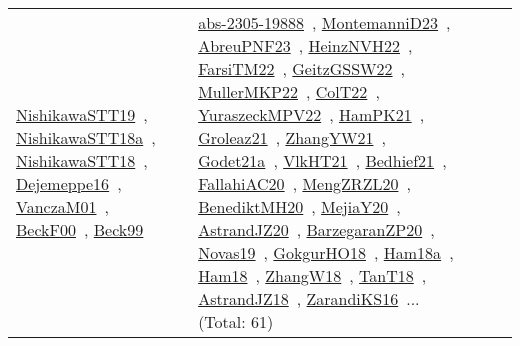 {\begin{longtable}{lp{3cm}>{\raggedright\arraybackslash}p{6cm}>{\raggedright\arraybackslash}p{6cm}>{\raggedright\arraybackslash}p{8cm}}
\href{works/NishikawaSTT19.pdf}{NishikawaSTT19}~\cite{NishikawaSTT19}, \href{works/NishikawaSTT18a.pdf}{NishikawaSTT18a}~\cite{NishikawaSTT18a}, \href{works/NishikawaSTT18.pdf}{NishikawaSTT18}~\cite{NishikawaSTT18}, \href{works/Dejemeppe16.pdf}{Dejemeppe16}~\cite{Dejemeppe16}, \href{works/VanczaM01.pdf}{VanczaM01}~\cite{VanczaM01}, \href{works/BeckF00.pdf}{BeckF00}~\cite{BeckF00}, \href{works/Beck99.pdf}{Beck99}~\cite{Beck99} & \href{works/abs-2305-19888.pdf}{abs-2305-19888}~\cite{abs-2305-19888}, \href{works/MontemanniD23.pdf}{MontemanniD23}~\cite{MontemanniD23}, \href{works/AbreuPNF23.pdf}{AbreuPNF23}~\cite{AbreuPNF23}, \href{works/HeinzNVH22.pdf}{HeinzNVH22}~\cite{HeinzNVH22}, \href{works/FarsiTM22.pdf}{FarsiTM22}~\cite{FarsiTM22}, \href{works/GeitzGSSW22.pdf}{GeitzGSSW22}~\cite{GeitzGSSW22}, \href{works/MullerMKP22.pdf}{MullerMKP22}~\cite{MullerMKP22}, \href{works/ColT22.pdf}{ColT22}~\cite{ColT22}, \href{works/YuraszeckMPV22.pdf}{YuraszeckMPV22}~\cite{YuraszeckMPV22}, \href{works/HamPK21.pdf}{HamPK21}~\cite{HamPK21}, \href{works/Groleaz21.pdf}{Groleaz21}~\cite{Groleaz21}, \href{works/ZhangYW21.pdf}{ZhangYW21}~\cite{ZhangYW21}, \href{works/Godet21a.pdf}{Godet21a}~\cite{Godet21a}, \href{works/VlkHT21.pdf}{VlkHT21}~\cite{VlkHT21}, \href{works/Bedhief21.pdf}{Bedhief21}~\cite{Bedhief21}, \href{works/FallahiAC20.pdf}{FallahiAC20}~\cite{FallahiAC20}, \href{works/MengZRZL20.pdf}{MengZRZL20}~\cite{MengZRZL20}, \href{works/BenediktMH20.pdf}{BenediktMH20}~\cite{BenediktMH20}, \href{works/MejiaY20.pdf}{MejiaY20}~\cite{MejiaY20}, \href{works/AstrandJZ20.pdf}{AstrandJZ20}~\cite{AstrandJZ20}, \href{works/BarzegaranZP20.pdf}{BarzegaranZP20}~\cite{BarzegaranZP20}, \href{works/Novas19.pdf}{Novas19}~\cite{Novas19}, \href{works/GokgurHO18.pdf}{GokgurHO18}~\cite{GokgurHO18}, \href{works/Ham18a.pdf}{Ham18a}~\cite{Ham18a}, \href{works/Ham18.pdf}{Ham18}~\cite{Ham18}, \href{works/ZhangW18.pdf}{ZhangW18}~\cite{ZhangW18}, \href{works/TanT18.pdf}{TanT18}~\cite{TanT18}, \href{works/AstrandJZ18.pdf}{AstrandJZ18}~\cite{AstrandJZ18}, \href{works/ZarandiKS16.pdf}{ZarandiKS16}~\cite{ZarandiKS16}... (Total: 61)\\

\end{longtable}}
